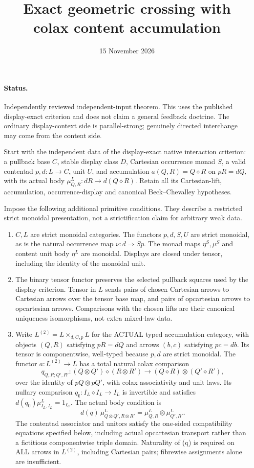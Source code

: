 \documentclass[11pt]{article}
\title{Exact geometric crossing with colax content accumulation}
\date{15 November 2026}
\begin{document}
\maketitle
\paragraph{Status.} Independently reviewed independent-input theorem. This uses the published display-exact criterion and does not claim a general feedback doctrine. The ordinary display-context side is parallel-strong; genuinely directed interchange may come from the content side.

Start with the independent data of the display-exact native interaction criterion: a pullback base $C$, stable display class $D$, Cartesian occurrence monad $S$, a valid contentad $p,d:L\to C$, unit $U$, and accumulation $a(Q,R)=Q\diamond R$ on $pR=dQ$, with its actual body $\mu^L_{Q,R}:dR\to d(Q\diamond R)$. Retain all its Cartesian-lift, accumulation, occurrence-display and canonical Beck--Chevalley hypotheses.

Impose the following additional primitive conditions. They describe a restricted strict monoidal presentation, not a strictification claim for arbitrary weak data.
\begin{enumerate}
\item $C,L$ are strict monoidal categories. The functors $p,d,S,U$ are strict monoidal, as is the natural occurrence map $\nu:d\Rightarrow Sp$. The monad maps $\eta^S,\mu^S$ and content unit body $\eta^L$ are monoidal. Displays are closed under tensor, including the identity of the monoidal unit.
\item The binary tensor functor preserves the selected pullback squares used by the display criterion. Tensor in $L$ sends pairs of chosen Cartesian arrows to Cartesian arrows over the tensor base map, and pairs of opcartesian arrows to opcartesian arrows. Comparisons with the chosen lifts are their canonical uniqueness isomorphisms, not extra mixed-law data.
\item Write $L^{(2)}=L\mathbin{\times}_{d,C,p}L$ for the ACTUAL typed accumulation category, with objects $(Q,R)$ satisfying $pR=dQ$ and arrows $(b,c)$ satisfying $pc=db$. Its tensor is componentwise, well-typed because $p,d$ are strict monoidal. The functor $a:L^{(2)}\to L$ has a total natural colax comparison
\[
 q_{Q,R;Q',R'}:(Q\otimes Q')\diamond(R\otimes R')
 \longrightarrow (Q\diamond R)\otimes(Q'\diamond R'), \tag{q}
\]
over the identity of $pQ\otimes pQ'$, with colax associativity and unit laws. Its nullary comparison $q_0:I_L\diamond I_L\to I_L$ is invertible and satisfies $d(q_0)\mu^L_{I_L,I_L}=1_{I_C}$. The actual body condition is
\[
 d(q)\,\mu^L_{Q\otimes Q',R\otimes R'}
 =\mu^L_{Q,R}\otimes\mu^L_{Q',R'}.                  \tag{b}
\]
The contentad associator and unitors satisfy the one-sided compatibility equations specified below, including actual opcartesian transport rather than a fictitious componentwise triple domain. Naturality of (q) is required on ALL arrows in $L^{(2)}$, including Cartesian pairs; fibrewise assignments alone are insufficient.
\end{enumerate}
\end{document}
